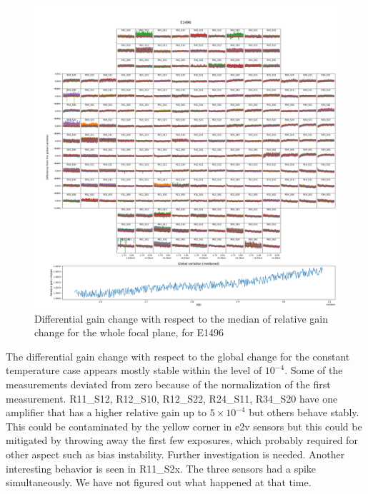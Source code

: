 \begin{figure}[ht]
    \centering
    \includegraphics[width=1\linewidth]{figures/gaintemp/E1496gainoverall_global.png}
    \caption{Differential gain change with respect to the median of relative gain change for the whole focal plane, for E1496}
    \label{fig:relative-gain-E1496}
\end{figure}
The differential gain change with respect to the global change for the constant temperature case appears mostly stable within the level of $10^{-4}$. Some of the measurements deviated from zero because of the normalization of the first measurement. R11\_S12, R12\_S10, R12\_S22, R24\_S11, R34\_S20 have one amplifier that has a higher relative gain up to $5\times 10^{-4}$ but others behave stably. This could be contaminated by the yellow corner in e2v sensors but this could be mitigated by throwing away the first few exposures, which probably required for other aspect such as bias instability. Further investigation is needed. Another interesting behavior is seen in R11\_S2x. The three sensors had a spike simultaneously. We have not figured out what happened at that time.

